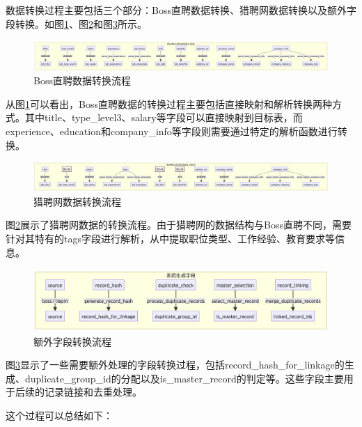 数据转换过程主要包括三个部分：Boss直聘数据转换、猎聘网数据转换以及额外字段转换。如图\ref{fig:boss_transform}、图\ref{fig:liepin_transform}和图\ref{fig:extra_transform}所示。

\begin{figure}[htbp]
    \centering
    \includegraphics[width=1.0\textwidth]{figures/T过程boss.png}
    \caption{Boss直聘数据转换流程}
    \label{fig:boss_transform}
\end{figure}

从图\ref{fig:boss_transform}可以看出，Boss直聘数据的转换过程主要包括直接映射和解析转换两种方式。其中title、type\_level3、salary等字段可以直接映射到目标表，而experience、education和company\_info等字段则需要通过特定的解析函数进行转换。

\begin{figure}[htbp]
    \centering
    \includegraphics[width=1.0\textwidth]{figures/T过程liepin.png}
    \caption{猎聘网数据转换流程}
    \label{fig:liepin_transform}
\end{figure}

图\ref{fig:liepin_transform}展示了猎聘网数据的转换流程。由于猎聘网的数据结构与Boss直聘不同，需要针对其特有的tags字段进行解析，从中提取职位类型、工作经验、教育要求等信息。

\begin{figure}[htbp]
    \centering
    \includegraphics[width=1\textwidth]{figures/T过程extra.png}
    \caption{额外字段转换流程}
    \label{fig:extra_transform}
\end{figure}

图\ref{fig:extra_transform}显示了一些需要额外处理的字段转换过程，包括record\_hash\_for\_linkage的生成、duplicate\_group\_id的分配以及is\_master\_record的判定等。这些字段主要用于后续的记录链接和去重处理。

这个过程可以总结如下：

